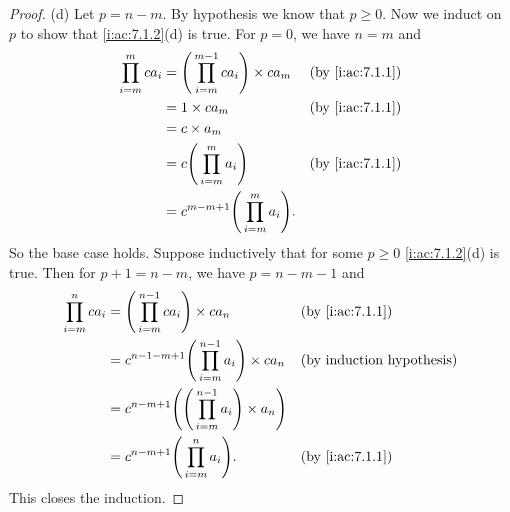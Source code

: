 \begin{proof}{(d)}
  Let \(p = n - m\).
  By hypothesis we know that \(p \geq 0\).
  Now we induct on \(p\) to show that \cref{i:ac:7.1.2}(d) is true.
  For \(p = 0\), we have \(n = m\) and
  \begin{align*}
    \prod_{i = m}^m ca_i & = \Bigg(\prod_{i = m}^{m - 1} ca_i\Bigg) \times ca_m &  & \by{i:ac:7.1.1} \\
                         & = 1 \times ca_m                                      &  & \by{i:ac:7.1.1} \\
                         & = c \times a_m                                                            \\
                         & = c \Bigg(\prod_{i = m}^m a_i\Bigg)                  &  & \by{i:ac:7.1.1} \\
                         & = c^{m - m + 1} \Bigg(\prod_{i = m}^m a_i\Bigg).
  \end{align*}
  So the base case holds.
  Suppose inductively that for some \(p \geq 0\) \cref{i:ac:7.1.2}(d) is true.
  Then for \(p + 1 = n - m\), we have \(p = n - m - 1\) and
  \begin{align*}
    \prod_{i = m}^n ca_i & = \Bigg(\prod_{i = m}^{n - 1} ca_i\Bigg) \times ca_n                         &  & \by{i:ac:7.1.1} \\
                         & = c^{n - 1 - m + 1} \Bigg(\prod_{i = m}^{n - 1} a_i\Bigg) \times ca_n        &  & \byIH           \\
                         & = c^{n - m + 1} \Bigg(\Bigg(\prod_{i = m}^{n - 1} a_i\Bigg) \times a_n\Bigg)                      \\
                         & = c^{n - m + 1} \Bigg(\prod_{i = m}^n a_i\Bigg).                             &  & \by{i:ac:7.1.1}
  \end{align*}
  This closes the induction.
\end{proof}

